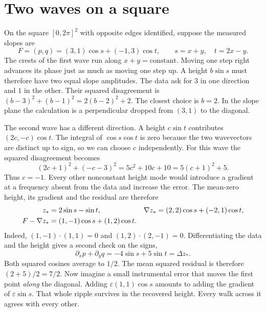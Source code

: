 \documentclass[11pt,a4paper]{article}
\numberwithin{equation}{section}
\begin{document}
\newpage
\section{Two waves on a square}

On the square $[0,2\pi]^2$ with opposite edges identified, suppose the measured
slopes are
\begin{equation}
 F=(p,q)=(3,1)\cos s+(-1,3)\cos t,\qquad s=x+y,\quad t=2x-y .
 \label{eq:two-waves}
\end{equation}
The crests of the first wave run along $x+y=\mathrm{constant}$. Moving
one step right advances its phase just as much as moving one step up.
A height $b\sin s$ must therefore have two equal slope amplitudes.
The data ask for $3$ in one direction and $1$ in the other. Their squared disagreement is
$(b-3)^2+(b-1)^2=2(b-2)^2+2$. The closest choice is $b=2$.
In the slope plane the calculation is a perpendicular dropped from
$(3,1)$ to the diagonal.

\begin{center}
\end{center}

The second wave has a different direction. A height $c\sin t$ contributes
$(2c,-c)\cos t$. The integral of $\cos s\cos t$ is zero because the two
wavevectors are distinct up to sign, so we can choose $c$ independently.
For this wave the squared disagreement becomes
\begin{equation}
 (2c+1)^2+(-c-3)^2=5c^2+10c+10=5(c+1)^2+5 .
\end{equation}
Thus $c=-1$. Every other nonconstant height mode would introduce a gradient
at a frequency absent from the data and increase the error. The mean-zero
height, its gradient and the residual are therefore
\begin{align}
 z_* &= 2\sin s-\sin t, &
 \nabla z_* &= (2,2)\cos s+(-2,1)\cos t, \notag\\
 F-\nabla z_* &= (1,-1)\cos s+(1,2)\cos t . &&
 \label{eq:two-wave-residual}
\end{align}
Indeed, $(1,-1)\cdot(1,1)=0$ and $(1,2)\cdot(2,-1)=0$.
Differentiating the data and the height gives a second check on the signs,
\begin{equation}
 \partial_x p+\partial_y q=-4\sin s+5\sin t=\Delta z_* .
\end{equation}
Both squared cosines average to $1/2$. The mean squared residual is therefore
$(2+5)/2=7/2$. Now imagine a small instrumental error that moves the first
point \emph{along} the diagonal. Adding $\varepsilon(1,1)\cos s$ amounts
to adding the gradient of $\varepsilon\sin s$. That whole ripple survives
in the recovered height. Every walk across it agrees with every other.
\end{document}
